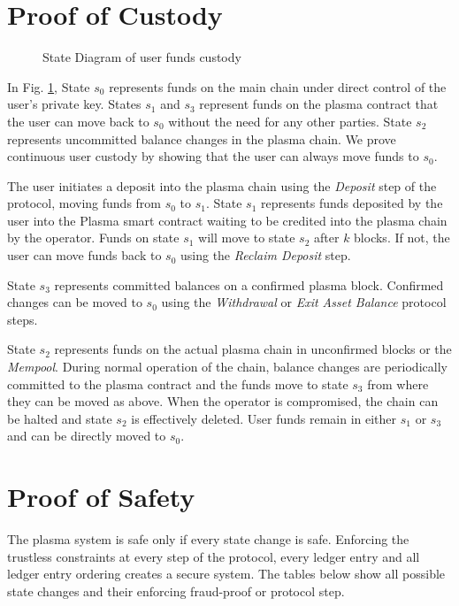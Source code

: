 \documentclass[12pt,a4paper]{article}
\begin{document}
\section{Proof of Custody}
\begin{figure}[ht]
    \centering

    \caption{State Diagram of user funds custody}
    \label{fig:custodystate}
\end{figure}

In Fig. \ref{fig:custodystate}, State $s_0$ represents funds on the main chain under direct control of the user's private key. States $s_1$ and $s_3$ represent funds on the plasma contract that the user can move back to $s_0$ without the need for any other parties. State $s_2$ represents uncommitted balance changes in the plasma chain. We prove continuous user custody by showing that the user can always move funds to $s_0$. 

The user initiates a deposit into the plasma chain using the \emph{Deposit} step of the protocol, moving funds from $s_0$ to $s_1$. State $s_1$ represents funds deposited by the user into the Plasma smart contract waiting to be credited into the plasma chain by the operator. Funds on state $s_1$ will move to state $s_2$ after $k$ blocks. If not, the user can move funds back to $s_0$ using the \emph{Reclaim Deposit} step.

State $s_3$ represents committed balances on a confirmed plasma block. Confirmed changes can be moved to $s_0$ using the \emph{Withdrawal} or \emph{Exit Asset Balance} protocol steps.

State $s_2$ represents funds on the actual plasma chain in unconfirmed blocks or the \emph{Mempool}. During normal operation of the chain, balance changes are periodically committed to the plasma contract and the funds move to state $s_3$ from where they can be moved as above. When the operator is compromised, the chain can be halted and state $s_2$ is effectively deleted. User funds remain in either $s_1$ or $s_3$ and can be directly moved to $s_0$. 


\newpage
\section{Proof of Safety}

The plasma system is safe only if every state change is safe. Enforcing the trustless constraints at every step of the protocol, every ledger entry and all ledger entry ordering creates a secure system. The tables below show all possible state changes and their enforcing fraud-proof or protocol step.
\end{document}
